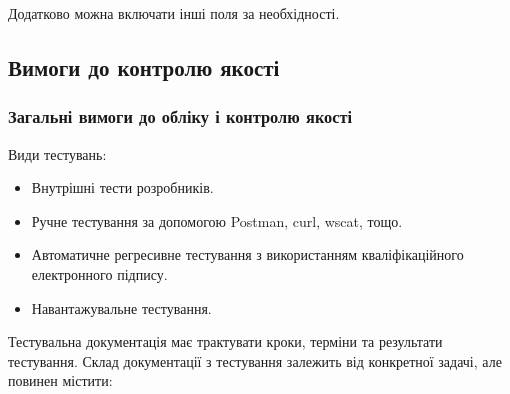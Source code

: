 \documentclass{article}
\begin{document}
Додатково можна включати інші поля за необхідності.

\newpage

\subsection{Вимоги до контролю якості}

\subsubsection{Загальні вимоги до обліку і контролю якості}

Види тестувань:
\begin{itemize}
    \item Внутрішні тести розробників.
    \item Ручне тестування за допомогою Postman, curl, wscat, тощо.
    \item Автоматичне регресивне тестування з використанням кваліфікаційного електронного підпису.
    \item Навантажувальне тестування.
\end{itemize}

Тестувальна документація має трактувати кроки, терміни та результати тестування.
Склад документації з тестування залежить від конкретної задачі, але повинен містити:
\end{document}
